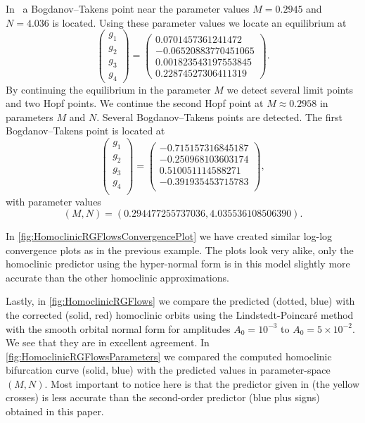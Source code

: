 In~\cite{Jepsen2021HomoclinicRG} a Bogdanov--Takens point near the parameter values
$M=0.2945$ and $N = 4.036$ is located. Using these parameter values we locate an
equilibrium at 
\[
\begin{pmatrix}
    g_1 \\ g_2 \\ g_3 \\ g_4
\end{pmatrix} = 
\begin{pmatrix}
    0.0701457361241472 \\ -0.06520883770451065 \\ 0.001823543197553845 \\ 0.22874527306411319
\end{pmatrix}.
\]
By continuing the equilibrium in the parameter $M$ we detect several limit
points and two Hopf points. We continue the second Hopf point at $M\approx0.2958$ 
in parameters $M$ and $N$. Several Bogdanov--Takens points are detected. The
first Bogdanov--Takens point is located at
\[
\begin{pmatrix}
    g_1 \\ g_2 \\ g_3 \\ g_4 \\ 
\end{pmatrix} = 
\begin{pmatrix}
    -0.715157316845187 \\ -0.250968103603174 \\ 0.510051114588271 \\ -0.391935453715783 \\
\end{pmatrix},
\]
with parameter values
\[
    (M, N) = (0.294477255737036, 4.035536108506390).
\]

In \cref{fig:HomoclinicRGFlowsConvergencePlot} we have created similar log-log
convergence plots as in the previous example. The plots look very alike, only
the homoclinic predictor using the hyper-normal form is in this model slightly
more accurate than the other homoclinic approximations.

Lastly, in \cref{fig:HomoclinicRGFlows}  we compare the predicted (dotted,
blue) with the corrected (solid, red) homoclinic orbits using the
Lindstedt-Poincar\'e method with the smooth orbital normal form for amplitudes
$A_0 = 10^{-3}$ to $A_0=5\times 10^{-2}$. We see that they are in excellent
agreement. In \cref{fig:HomoclinicRGFlowsParameters} we compared the computed
homoclinic bifurcation curve (solid, blue) with the predicted values in
parameter-space $(M, N)$. Most important to notice here is that the predictor
given in \cite{Al-Hdaibat2016} (the yellow crosses) is less accurate than the
second-order predictor (blue plus signs) obtained in this paper.

